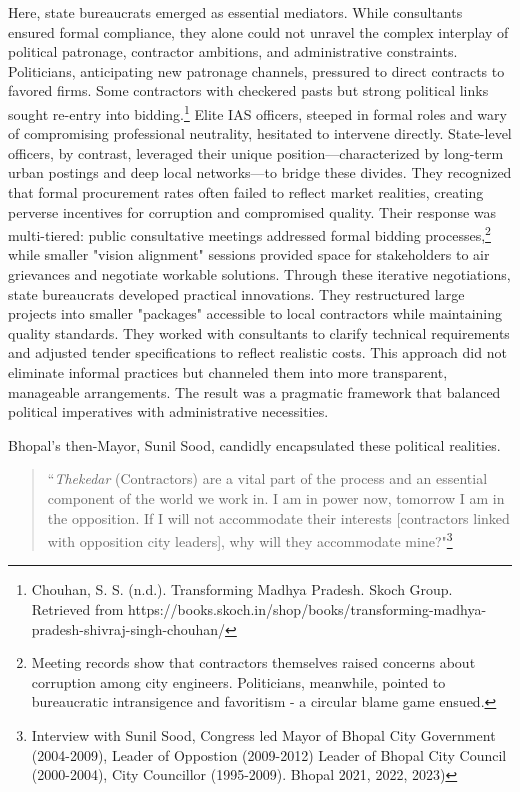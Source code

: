 Here, state bureaucrats emerged as essential mediators. While consultants ensured formal compliance, they alone could not unravel the complex interplay of political patronage, contractor ambitions, and administrative constraints. Politicians, anticipating new patronage channels, pressured to direct contracts to favored firms. Some contractors with checkered pasts but strong political links sought re-entry into bidding.\footnote{Chouhan, S. S. (n.d.). Transforming Madhya Pradesh. Skoch Group. Retrieved from https://books.skoch.in/shop/books/transforming-madhya-pradesh-shivraj-singh-chouhan/} Elite IAS officers, steeped in formal roles and wary of compromising professional neutrality, hesitated to intervene directly. State-level officers, by contrast, leveraged their unique position—characterized by long-term urban postings and deep local networks—to bridge these divides. They recognized that formal procurement rates often failed to reflect market realities, creating perverse incentives for corruption and compromised quality. Their response was multi-tiered: public consultative meetings addressed formal bidding processes,\footnote{Meeting records show that contractors themselves raised concerns about corruption among city engineers. Politicians, meanwhile, pointed to bureaucratic intransigence and favoritism - a circular blame game ensued. } while smaller "vision alignment" sessions provided space for stakeholders to air grievances and negotiate workable solutions. Through these iterative negotiations, state bureaucrats developed practical innovations. They restructured large projects into smaller "packages" accessible to local contractors while maintaining quality standards. They worked with consultants to clarify technical requirements and adjusted tender specifications to reflect realistic costs. This approach did not eliminate informal practices but channeled them into more transparent, manageable arrangements. The result was a pragmatic framework that balanced political imperatives with administrative necessities.

Bhopal’s then-Mayor, Sunil Sood, candidly encapsulated these political realities.

\begin{quote}
``\textit{Thekedar} (Contractors) are a vital part of the process and an essential component of the world we work in. I am in power now, tomorrow I am in the opposition. If I will not accommodate their interests [contractors linked with opposition city leaders], why will they accommodate mine?"\footnote{Interview with Sunil Sood, Congress led Mayor of Bhopal City Government (2004-2009), Leader of Oppostion (2009-2012) Leader of Bhopal City Council (2000-2004), City Councillor (1995-2009). Bhopal 2021, 2022, 2023) 
}
\end{quote}

